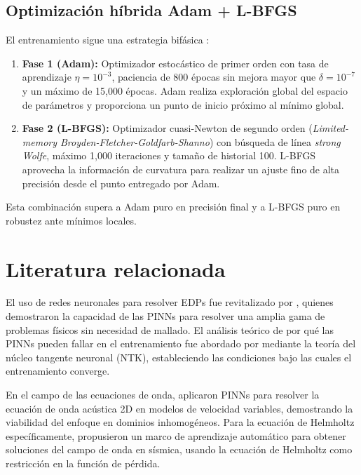 \subsection{Optimización híbrida Adam + L-BFGS}

El entrenamiento sigue una estrategia bifásica \parencite{cuomo2022scientific}:

\begin{enumerate}
    \item \textbf{Fase 1 (Adam):} Optimizador estocástico de primer orden
    \parencite{kingma2015adam} con tasa de aprendizaje $\eta = 10^{-3}$,
    paciencia de 800 épocas sin mejora mayor que $\delta = 10^{-7}$ y un
    máximo de 15{,}000 épocas. Adam realiza exploración global del espacio
    de parámetros y proporciona un punto de inicio próximo al mínimo global.

    \item \textbf{Fase 2 (L-BFGS):} Optimizador cuasi-Newton de segundo orden
    (\textit{Limited-memory Broyden-Fletcher-Goldfarb-Shanno})
    \parencite{nocedal2006numerical} con búsqueda de línea \textit{strong Wolfe},
    máximo 1{,}000 iteraciones y tamaño de historial 100. L-BFGS aprovecha la
    información de curvatura para realizar un ajuste fino de alta precisión
    desde el punto entregado por Adam.
\end{enumerate}

Esta combinación supera a Adam puro en precisión final y a L-BFGS puro en
robustez ante mínimos locales.

\section{Literatura relacionada}

El uso de redes neuronales para resolver EDPs fue revitalizado por
\textcite{raissi2019physics}, quienes demostraron la capacidad de las PINNs
para resolver una amplia gama de problemas físicos sin necesidad de mallado.
El análisis teórico de por qué las PINNs pueden fallar en el entrenamiento fue
abordado por \textcite{wang2022ntk} mediante la teoría del núcleo tangente
neuronal (NTK), estableciendo las condiciones bajo las cuales el entrenamiento
converge.

En el campo de las ecuaciones de onda, \textcite{moseley2020wave} aplicaron
PINNs para resolver la ecuación de onda acústica 2D en modelos de velocidad
variables, demostrando la viabilidad del enfoque en dominios inhomogéneos.
Para la ecuación de Helmholtz específicamente, \textcite{alkhalifah2021wavefield}
propusieron un marco de aprendizaje automático para obtener soluciones del campo
de onda en sísmica, usando la ecuación de Helmholtz como restricción en la
función de pérdida.

